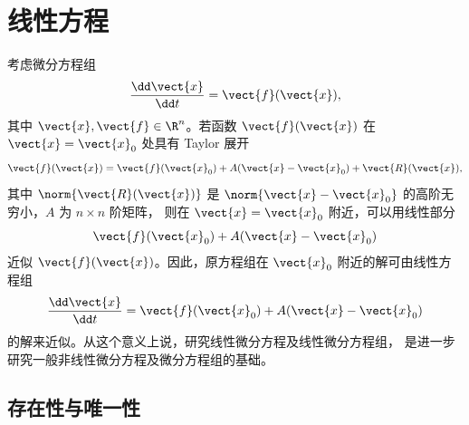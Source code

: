 
\setchapterintro{}
\chapter{线性方程}\label{chap:线性方程}

考虑微分方程组
\[
	\dfrac{\dd \vect{x}}{\dd t}=\vect{f}(\vect{x}),
\]
其中 $\vect{x},\vect{f}\in\R^n$。若函数 $\vect{f}(\vect{x})$ 在
$\vect{x}=\vect{x}_0$ 处具有 Taylor 展开
\[
	\vect{f}(\vect{x})
	=\vect{f}(\vect{x}_0)
	+A(\vect{x}-\vect{x}_0)
	+\vect{R}(\vect{x}),
\]
其中 $\norm{\vect{R}(\vect{x})}$ 是
$\norm{\vect{x}-\vect{x}_0}$ 的高阶无穷小，$A$ 为 $n\times n$ 阶矩阵，
则在 $\vect{x}=\vect{x}_0$ 附近，可以用线性部分
\[
	\vect{f}(\vect{x}_0)+A(\vect{x}-\vect{x}_0)
\]
近似 $\vect{f}(\vect{x})$。因此，原方程组在 $\vect{x}_0$ 附近的解可由线性方程组
\[
	\dfrac{\dd \vect{x}}{\dd t}
	=\vect{f}(\vect{x}_0)+A(\vect{x}-\vect{x}_0)
\]
的解来近似。从这个意义上说，研究线性微分方程及线性微分方程组，
是进一步研究一般非线性微分方程及微分方程组的基础。

\section{存在性与唯一性}\label{sec:线性方程组的存在性与唯一性}

